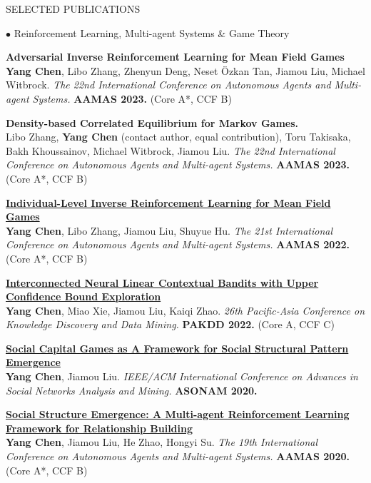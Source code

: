 \documentclass{resume} %
\begin{document}
\begin{rSection}{SELECTED PUBLICATIONS}
\begin{rSubsection}{\large $\bullet$ Reinforcement Learning, Multi-agent Systems \& Game Theory}{}{}{}
	\item {\bf Adversarial Inverse Reinforcement Learning for Mean Field Games}\\
		\textbf{Yang Chen}, Libo Zhang, Zhenyun Deng, Neset \"{O}zkan Tan, Jiamou Liu, Michael Witbrock. {\em The 22nd International Conference on Autonomous Agents and Multi-agent Systems.} \textbf{AAMAS 2023.} (Core A*, CCF B)
	\item {\bf Density-based Correlated Equilibrium for Markov Games.}\\
		Libo Zhang, \textbf{Yang Chen} (contact author, equal contribution), Toru Takisaka, Bakh Khoussainov, Michael Witbrock, Jiamou Liu. {\em The 22nd International Conference on Autonomous Agents and Multi-agent Systems.} \textbf{AAMAS 2023.} (Core A*, CCF B)
	\item {\href{https://ifaamas.org/Proceedings/aamas2022/pdfs/p253.pdf}{\bf Individual-Level Inverse Reinforcement Learning for Mean Field Games}}\\
		\textbf{Yang Chen}, Libo Zhang, Jiamou Liu, Shuyue Hu. {\em The 21st International Conference on Autonomous Agents and Multi-agent Systems.} \textbf{AAMAS 2022.} (Core A*, CCF B)
	\item {\href{}{\bf  Interconnected Neural Linear Contextual Bandits with Upper Confidence Bound Exploration}}\\
		\textbf{Yang Chen}, Miao Xie, Jiamou Liu, Kaiqi Zhao. {\em 26th Pacific-Asia Conference on Knowledge Discovery and Data Mining.} \textbf{PAKDD 2022.} (Core A, CCF C)
	\item {\href{http://www.ifaamas.org/Proceedings/aamas2020/pdfs/p1807.pdf}{\bf Social Capital Games as A Framework for Social Structural Pattern Emergence}}\\ 
		\textbf{Yang Chen}, Jiamou Liu. {\em IEEE/ACM International Conference on Advances in Social Networks Analysis and Mining.} \textbf{ASONAM 2020.}
	\item {\href{http://www.ifaamas.org/Proceedings/aamas2020/pdfs/p1807.pdf}{\bf Social Structure Emergence: A Multi-agent Reinforcement Learning Framework for Relationship Building}}\\ 
		\textbf{Yang Chen}, Jiamou Liu, He Zhao, Hongyi Su. {\em The 19th International Conference on Autonomous Agents and Multi-agent Systems.} \textbf{AAMAS 2020.} (Core A*, CCF B)

\end{rSubsection}
\end{rSection}
\end{document}
